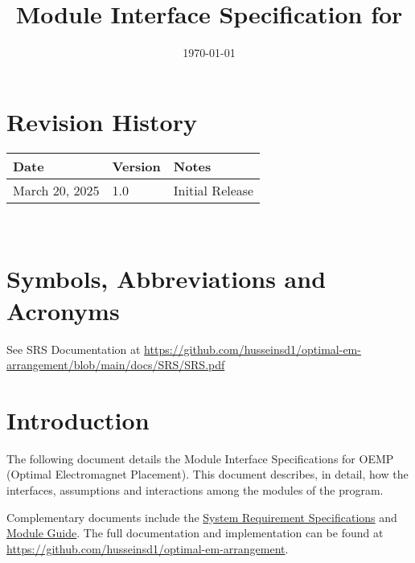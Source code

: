 \documentclass[12pt, titlepage]{article}
\begin{document}
\title{Module Interface Specification for \progname{}}

\author{\authname}

\date{\today}

\maketitle


\section{Revision History}

\begin{tabularx}{\textwidth}{p{3cm}p{2cm}X}
\toprule {\bf Date} & {\bf Version} & {\bf Notes}\\
\midrule
March 20, 2025 & 1.0 & Initial Release\\
\bottomrule
\end{tabularx}

~\newpage

\section{Symbols, Abbreviations and Acronyms}

See SRS Documentation at \url{https://github.com/husseinsd1/optimal-em-arrangement/blob/main/docs/SRS/SRS.pdf}
\newpage

\tableofcontents

\newpage


\section{Introduction}

The following document details the Module Interface Specifications for
OEMP (Optimal Electromagnet Placement). This document describes, in detail, how the interfaces, assumptions and interactions among the modules of the program. 

Complementary documents include the \href{https://github.com/husseinsd1/optimal-em-arrangement/blob/main/docs/SRS/SRS.pdf}{System Requirement Specifications} and \href{https://github.com/husseinsd1/optimal-em-arrangement/blob/main/docs/Design/SoftArchitecture/MG.pdf}{Module Guide}. The full documentation and implementation can be
found at \url{https://github.com/husseinsd1/optimal-em-arrangement}.
\end{document}
